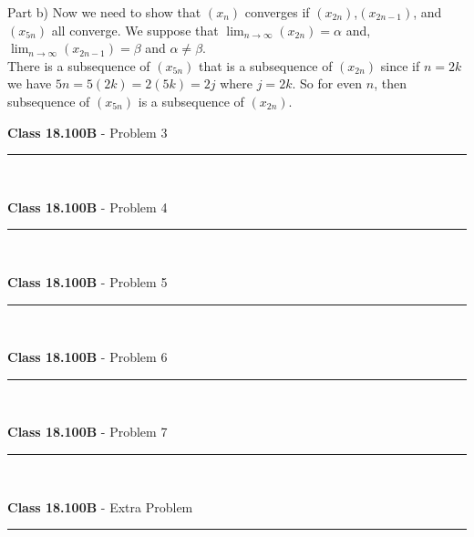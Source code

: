 \documentclass[11pt,reqno]{article}
\begin{document}
Part b) Now we need to show that $(x_n)$ converges if $(x_{2n})$,$(x_{2n-1})$, and $(x_{5n})$ all converge. We suppose that $\lim_{n \to \infty}(x_{2n}) = \alpha$ and, $\lim_{n \to \infty}(x_{2n-1}) = \beta$ and $\alpha \neq \beta$. \\
\indent There is a subsequence of $(x_{5n})$ that is a subsequence of $(x_{2n})$ since if $n = 2k$ we have $5n = 5(2k) = 2(5k) = 2j$ where $j = 2k$. So for even $n$, then subsequence of $(x_{5n})$ is a subsequence of $(x_{2n})$.


\vspace{15pt}
\begin{flushleft} 
\textbf{Class 18.100B} - Problem 3\\
\rule{500pt}{1pt}\\
\end{flushleft} 


\vspace{15pt}
\begin{flushleft} 
\textbf{Class 18.100B} - Problem 4\\
\rule{500pt}{1pt}\\
\end{flushleft} 


\vspace{15pt}
\begin{flushleft} 
\textbf{Class 18.100B} - Problem 5\\
\rule{500pt}{1pt}\\
\end{flushleft} 


\vspace{15pt}
\begin{flushleft} 
\textbf{Class 18.100B} - Problem 6\\
\rule{500pt}{1pt}\\
\end{flushleft} 


\vspace{15pt}
\begin{flushleft} 
\textbf{Class 18.100B} - Problem 7\\
\rule{500pt}{1pt}\\
\end{flushleft} 


\vspace{15pt}
\begin{flushleft} 
\textbf{Class 18.100B} - Extra Problem \\
\rule{500pt}{1pt}\\
\end{flushleft} 
\end{document}
